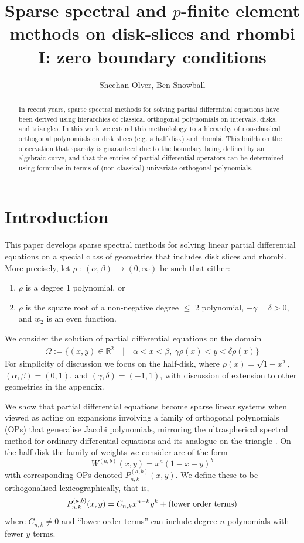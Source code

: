 \documentclass[11pt, oneside]{article}   	%
\title{Sparse spectral and $p$-finite element methods on disk-slices and rhombi I: zero boundary conditions}
\author{Sheehan Olver, Ben Snowball}
\newcommand{\R}{\mathbb{R}}
\begin{document}
\maketitle

\begin{abstract}
In recent years, sparse spectral methods for solving partial differential equations have been derived using hierarchies of classical orthogonal polynomials on intervals, disks, and triangles. In this work we extend this methodology to a hierarchy of non-classical orthogonal polynomials on disk slices (e.g. a half disk) and rhombi. This builds on the observation that sparsity is guaranteed due to the boundary being defined by an algebraic curve, and that the entries of partial differential operators can be determined using formulae in terms of (non-classical) univariate orthogonal polynomials. 
\end{abstract}


%
\section{Introduction}

This paper develops sparse spectral methods for solving linear partial differential equations on a special class of geometries that includes disk slices and rhombi.  
More precisely, let  \(\rho \: : \: (\alpha,\beta) \: \to (0,\infty)\) be such that either:

\begin{enumerate}
\item  \(\rho\) is a degree 1 polynomial, or 
\item \(\rho\) is the square root of a non-negative degree \(\le\) 2 polynomial, \(-\gamma = \delta > 0\), and \(w_2\) is an even function.
\end{enumerate}

We consider the solution of partial differential equations on the domain
\begin{align}
\Omega := \{(x,y) \in \R^2 \quad | \quad \alpha < x < \beta, \: \gamma \rho(x) < y < \delta \rho(x)\}
\end{align}
For simplicity of discussion we focus on the half-disk, where $\rho(x) = \sqrt{1-x^2}$,  $(\alpha,\beta) = (0, 1)$, and  $(\gamma, \delta)  = (-1,1)$, with discussion of extension to other geometries in the appendix. 


We show that partial differential equations become sparse linear systems when viewed as acting on expansions involving a family of orthogonal polynomials (OPs) that  generalise Jacobi polynomials, mirroring the ultraspherical spectral method for ordinary differential equations \cite{olver2013fast} and its analogue on the triangle \cite{olver2018recurrence,olver2019triangle}.  On the half-disk the family of weights we consider are of the form
$$
W^{(a,b)}(x,y) = x^a (1-x-y)^b
$$
with corresponding OPs denoted $P_{n,k}^{(a,b)}(x,y)$. We define these to be orthogonalised lexicographically, that is,
$$
P_{n,k}^{(a,b)}(x,y) = C_{n,k} x^{n-k} y^k + (\hbox{lower order terms})
$$
where $C_{n,k} \neq 0$ and ``lower order terms'' can  include degree $n$ polynomials with fewer $y$ terms.
\end{document}
